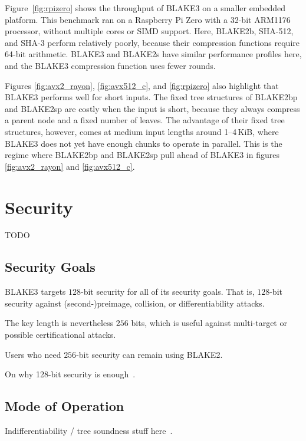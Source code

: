\documentclass[12pt,notitlepage,a4paper]{article}
\begin{document}
Figure~\ref{fig:rpizero} shows the throughput of BLAKE3 on a smaller embedded
platform. This benchmark ran on a Raspberry Pi Zero with a 32-bit ARM1176
processor, without multiple cores or SIMD support. Here, BLAKE2b, SHA-512, and
SHA-3 perform relatively poorly, because their compression functions require
64-bit arithmetic. BLAKE3 and BLAKE2s have similar performance profiles here,
and the BLAKE3 compression function uses fewer rounds.

Figures \ref{fig:avx2_rayon}, \ref{fig:avx512_c}, and \ref{fig:rpizero} also
highlight that BLAKE3 performs well for short inputs. The fixed tree structures
of BLAKE2bp and BLAKE2sp are costly when the input is short, because they
always compress a parent node and a fixed number of leaves. The advantage of
their fixed tree structures, however, comes at medium input lengths around
1--4\,KiB, where BLAKE3 does not yet have enough chunks to operate in parallel.
This is the regime where BLAKE2bp and BLAKE2sp pull ahead of BLAKE3 in figures
\ref{fig:avx2_rayon} and \ref{fig:avx512_c}.

\section{Security}\label{sec:security}

TODO

\subsection{Security Goals}\label{sec:goals}

BLAKE3 targets $128$-bit security for all of its security goals. That is, $128$-bit security against (second-)preimage, collision, or differentiability attacks.

The key length is nevertheless $256$ bits, which is useful against multi-target or possible certificational attacks.

Users who need $256$-bit security can remain using BLAKE2.

On why 128-bit security is enough~\cite{TMC}.

\subsection{Mode of Operation}\label{sec:mode}

Indifferentiability / tree soundness stuff here~\cite{DBLP:journals/ijisec/BertoniDPA14,DBLP:journals/tosc/LuykxMN16,DBLP:journals/tosc/DaemenMA18}.
\end{document}
